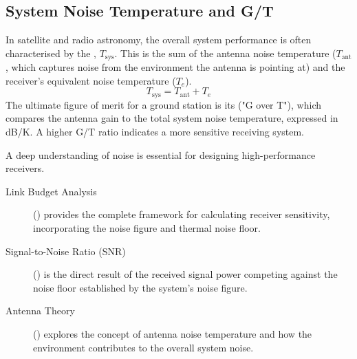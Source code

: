 \subsection{System Noise Temperature and G/T}

In satellite and radio astronomy, the overall system performance is often characterised by the , $T_{\text{sys}}$. This is the sum of the antenna noise temperature ($T_{\text{ant}}$, which captures noise from the environment the antenna is pointing at) and the receiver's equivalent noise temperature ($T_e$).
\begin{equation}
    T_{\text{sys}} = T_{\text{ant}} + T_e
\end{equation}
The ultimate figure of merit for a ground station is its  ("G over T"), which compares the antenna gain to the total system noise temperature, expressed in dB/K. A higher G/T ratio indicates a more sensitive receiving system.


\begin{importantbox}[title={Further Reading}]
    A deep understanding of noise is essential for designing high-performance receivers.
    \begin{description}
        \item[Link Budget Analysis] () provides the complete framework for calculating receiver sensitivity, incorporating the noise figure and thermal noise floor.
        \item[Signal-to-Noise Ratio (SNR)] () is the direct result of the received signal power competing against the noise floor established by the system's noise figure.
        \item[Antenna Theory] () explores the concept of antenna noise temperature and how the environment contributes to the overall system noise.
    \end{description}
\end{importantbox}